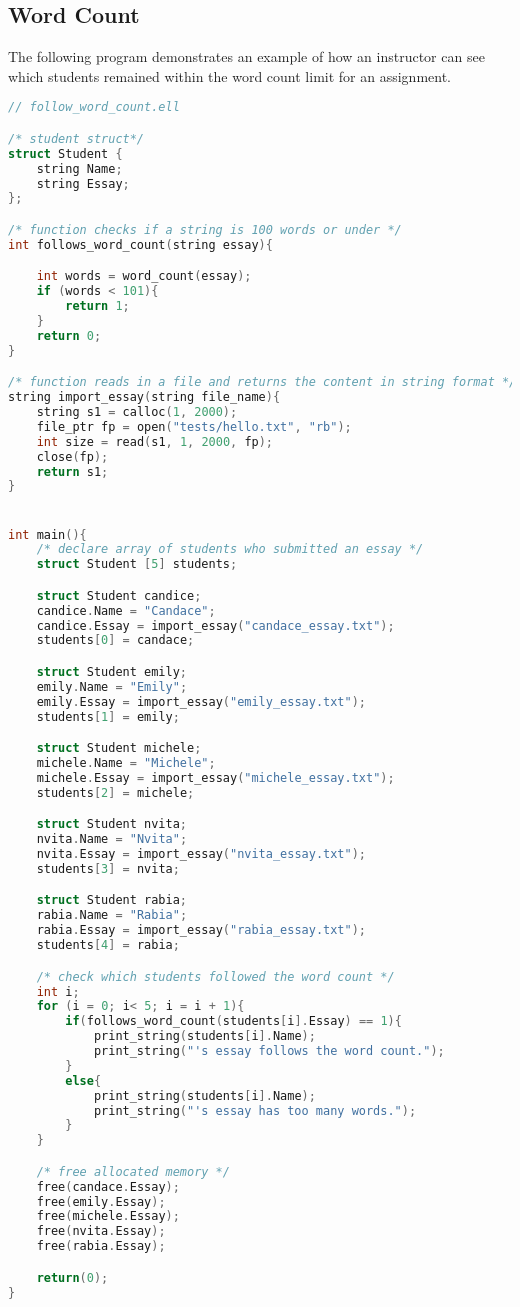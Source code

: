 \documentclass{article}
\begin{document}
\subsection{Word Count}
The following program demonstrates an example of how an instructor can see which students remained within the word count limit for an assignment.
\begin{lstlisting}[language=C]
// follow_word_count.ell

/* student struct*/
struct Student {
	string Name;
	string Essay;
};

/* function checks if a string is 100 words or under */
int follows_word_count(string essay){

	int words = word_count(essay);
	if (words < 101){
		return 1;
	}
	return 0;
}

/* function reads in a file and returns the content in string format */
string import_essay(string file_name){
	string s1 = calloc(1, 2000);
	file_ptr fp = open("tests/hello.txt", "rb");
   	int size = read(s1, 1, 2000, fp);
   	close(fp);
   	return s1;	
}


int main(){
	/* declare array of students who submitted an essay */
	struct Student [5] students;

	struct Student candice;
	candice.Name = "Candace";
	candice.Essay = import_essay("candace_essay.txt");
	students[0] = candace;

	struct Student emily;
	emily.Name = "Emily";
	emily.Essay = import_essay("emily_essay.txt");
	students[1] = emily;

	struct Student michele;
	michele.Name = "Michele";
	michele.Essay = import_essay("michele_essay.txt");
	students[2] = michele;

	struct Student nvita;
	nvita.Name = "Nvita";
	nvita.Essay = import_essay("nvita_essay.txt");
	students[3] = nvita;

	struct Student rabia;
	rabia.Name = "Rabia";
	rabia.Essay = import_essay("rabia_essay.txt");
	students[4] = rabia;

	/* check which students followed the word count */
	int i;
	for (i = 0; i< 5; i = i + 1){
		if(follows_word_count(students[i].Essay) == 1){
			print_string(students[i].Name);
			print_string("'s essay follows the word count.");
		}
		else{
			print_string(students[i].Name);
			print_string("'s essay has too many words.");
		}
	}

	/* free allocated memory */
   	free(candace.Essay);
   	free(emily.Essay);
   	free(michele.Essay);
   	free(nvita.Essay);
   	free(rabia.Essay);

	return(0);
}
\end{lstlisting}
\end{document}
